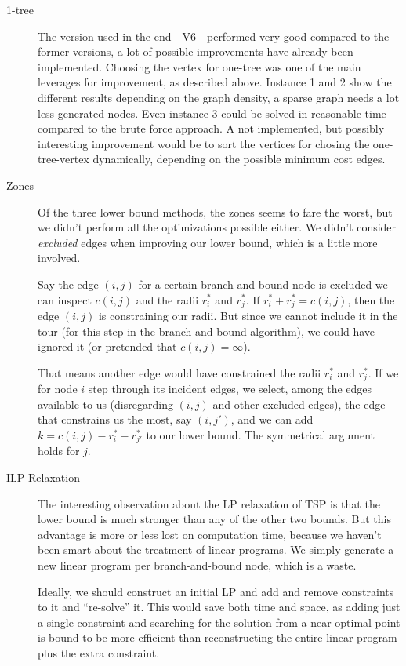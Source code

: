 \documentclass{article}
\begin{document}
\begin{description}
\item[1-tree] The version used in the end - V6 - performed very good compared to the former versions, a lot of possible improvements have already been implemented. Choosing the vertex for one-tree was one of the main leverages for improvement, as described above. Instance 1 and 2 show the different results depending on the graph density, a sparse graph needs a lot less generated nodes. Even instance 3 could be solved in reasonable time compared to the brute force approach. A not implemented, but possibly interesting improvement would be to sort the vertices for chosing the one-tree-vertex dynamically, depending on the possible minimum cost edges.
\item[Zones] Of the three lower bound methods, the zones seems to fare
  the worst, but we didn't perform all the optimizations possible
  either. We didn't consider \emph{excluded} edges when improving our
  lower bound, which is a little more involved.

  Say the edge $(i,j)$ for a certain branch-and-bound node is excluded
  we can inspect $c(i,j)$ and the radii $r_i^*$ and $r_j^*$. If $r_i^*
  + r_j^* = c(i,j)$, then the edge $(i,j)$ is constraining our
  radii. But since we cannot include it in the tour (for this step in
  the branch-and-bound algorithm), we could have ignored it (or
  pretended that $c(i,j) = \infty$).

  That means another edge would have constrained the radii $r_i^*$
  and $r_j^*$. If we for node $i$ step through its incident edges, we
  select, among the edges available to us (disregarding $(i,j)$ and
  other excluded edges), the edge that constrains us the most, say
  $(i,j')$, and we can add $k = c(i,j) - r_i^* - r_{j'}^*$ to our
  lower bound. The symmetrical argument holds for $j$.
\item[ILP Relaxation]
  The interesting observation about the LP relaxation of TSP is that
  the lower bound is much stronger than any of the other two
  bounds. But this advantage is more or less lost on computation time,
  because we haven't been smart about the treatment of linear
  programs. We simply generate a new linear program per
  branch-and-bound node, which is a waste.

  Ideally, we should construct an initial LP and add and remove
  constraints to it and ``re-solve'' it. This would save both time and
  space, as adding just a single constraint and searching for the
  solution from a near-optimal point is bound to be more efficient
  than reconstructing the entire linear program plus the extra constraint.
\end{description}
\end{document}

